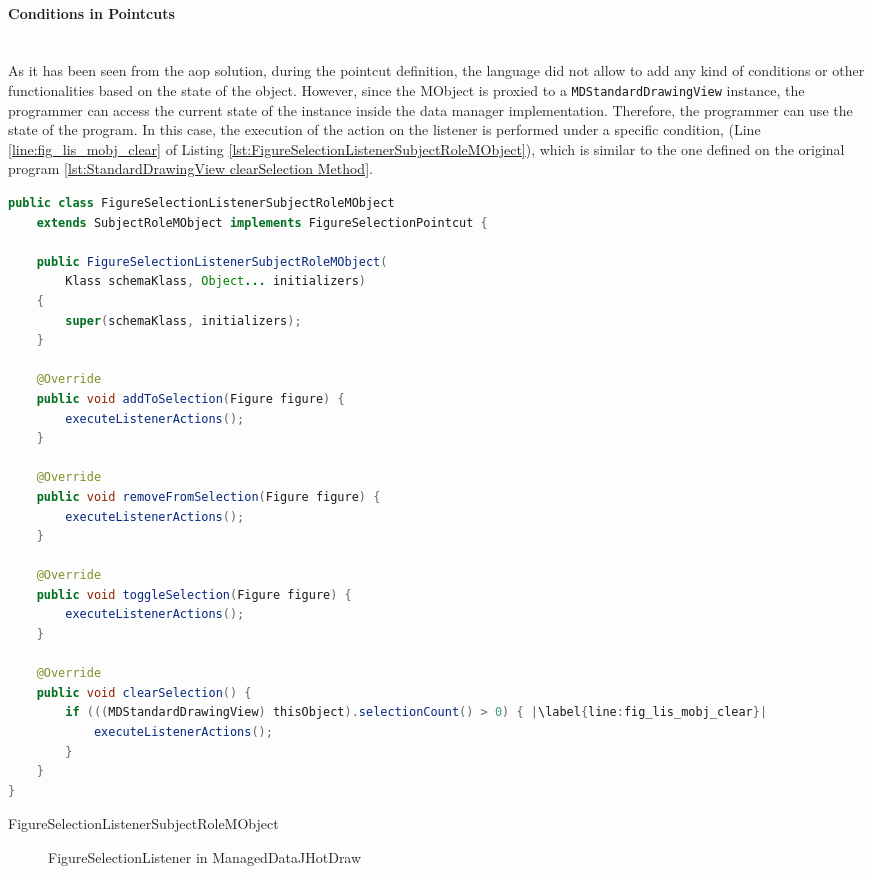 \paragraph{Conditions in Pointcuts}\mbox{}\\
As it has been seen from the \ac{aop} solution, during the pointcut definition, the language did not allow to add any kind of conditions or other functionalities based on the state of the object.
However, since the MObject is proxied to a \texttt{MDStandardDrawingView} instance, the programmer can access the current state of the instance inside the data manager implementation.
Therefore, the programmer can use the state of the program.
In this case, the execution of the action on the listener is performed under a specific condition, (Line \ref{line:fig_lis_mobj_clear} of Listing \ref{lst:FigureSelectionListenerSubjectRoleMObject}), which is similar to the one defined on the original program \ref{lst:StandardDrawingView clearSelection Method}.

\begin{sourcecode} [H]
	\begin{lstlisting}[language=Java, escapechar=|]
public class FigureSelectionListenerSubjectRoleMObject 
	extends SubjectRoleMObject implements FigureSelectionPointcut {

	public FigureSelectionListenerSubjectRoleMObject(
		Klass schemaKlass, Object... initializers) 
	{
		super(schemaKlass, initializers);
	}

	@Override
	public void addToSelection(Figure figure) {
		executeListenerActions();
	}

	@Override
	public void removeFromSelection(Figure figure) {
		executeListenerActions();
	}

	@Override
	public void toggleSelection(Figure figure) {
		executeListenerActions();
	}

	@Override
	public void clearSelection() {
		if (((MDStandardDrawingView) thisObject).selectionCount() > 0) { |\label{line:fig_lis_mobj_clear}|
			executeListenerActions();
		}
	}
}
	\end{lstlisting}
	\caption{FigureSelectionListenerSubjectRoleMObject}
	\label{lst:FigureSelectionListenerSubjectRoleMObject}
\end{sourcecode}

\begin{figure} [H]
	\centering
  	\caption{FigureSelectionListener in ManagedDataJHotDraw}
  	\label{fig:JHotDraw_FigureSelectionListener_MD}
\end{figure}

